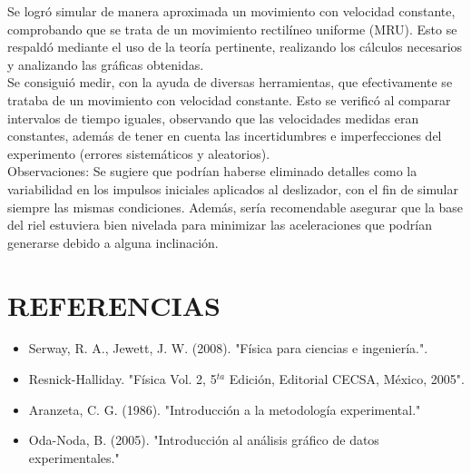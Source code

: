 \documentclass[journal]{IEEEtran}
\begin{document}
Se logró simular de manera aproximada un movimiento con velocidad constante, comprobando que se trata de un movimiento rectilíneo uniforme (MRU). Esto se respaldó mediante el uso de la teoría pertinente, realizando los cálculos necesarios y analizando las gráficas obtenidas. \\

Se consiguió medir, con la ayuda de diversas herramientas, que efectivamente se trataba de un movimiento con velocidad constante. Esto se verificó al comparar intervalos de tiempo iguales, observando que las velocidades medidas eran constantes, además de tener en cuenta las incertidumbres e imperfecciones del experimento (errores sistemáticos y aleatorios). \\

Observaciones: Se sugiere que podrían haberse eliminado detalles como la variabilidad en los impulsos iniciales aplicados al deslizador, con el fin de simular siempre las mismas condiciones. Además, sería recomendable asegurar que la base del riel estuviera bien nivelada para minimizar las aceleraciones que podrían generarse debido a alguna inclinación.


\section{ REFERENCIAS}
\begin{itemize}
\item Serway, R. A., Jewett, J. W. (2008). "Física para ciencias e ingeniería.".
\item Resnick-Halliday. "Física Vol. 2, 5$^{ta}$ Edición, Editorial CECSA, México, 2005".
\item Aranzeta, C. G. (1986). "Introducción a la metodología experimental."
\item Oda-Noda, B. (2005). "Introducción al análisis gráfico de datos experimentales." 
\end{itemize}
\end{document}
